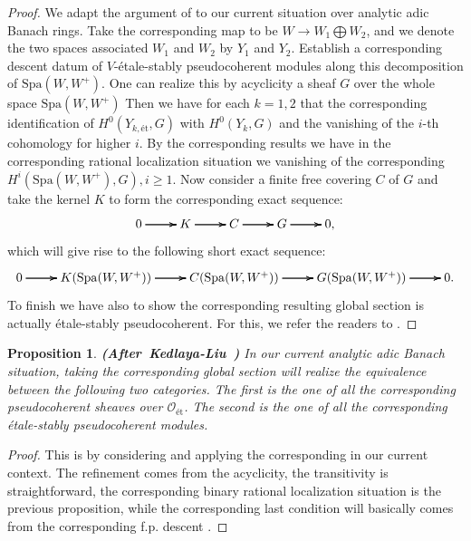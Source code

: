 \documentclass[12pt]{amsart}
\newtheorem{proposition}[theorem]{Proposition}
\theoremstyle{definition}
\numberwithin{equation}{section}
\begin{document}
\begin{proof}
We adapt the argument of \cite[Lemma 2.5.13]{KL2} to our current situation over analytic adic Banach rings. Take the corresponding map to be $W\rightarrow W_1\bigoplus W_2$, and we denote the two spaces associated $W_1$ and $W_2$ by $Y_1$ and $Y_2$. Establish a corresponding descent datum of $V$-\'etale-stably pseudocoherent modules along this decomposition of $\mathrm{Spa}(W,W^+)$. One can realize this by acyclicity a sheaf $G$ over the whole space $\mathrm{Spa}(W,W^+)$ Then we have for each $k=1,2$ that the corresponding identification of $H^0(Y_{k,\text{\'et}},G)$ with $H^0(Y_k,G)$ and the vanishing of the $i$-th cohomology for higher $i$. By the corresponding results we have in the corresponding rational localization situation we vanishing of the corresponding $H^i(\mathrm{Spa}(W,W^+),G),i\geq 1$. Now consider a finite free covering $C$ of $G$ and take the kernel $K$ to form the corresponding exact sequence:
\[
\xymatrix@C+0pc@R+0pc{
0 \ar[r] \ar[r] \ar[r] &K \ar[r] \ar[r] \ar[r] &C  \ar[r] \ar[r] \ar[r] &G \ar[r] \ar[r] \ar[r] &0 ,   
}
\]
which will give rise to the following short exact sequence:
\[
\xymatrix@C+0pc@R+0pc{
0 \ar[r] \ar[r] \ar[r] &K(\mathrm{Spa}(W,W^+)) \ar[r] \ar[r] \ar[r] &C(\mathrm{Spa}(W,W^+))  \ar[r] \ar[r] \ar[r] &G(\mathrm{Spa}(W,W^+)) \ar[r] \ar[r] \ar[r] &0.   
}
\]
To finish we have also to show the corresponding resulting global section is actually \'etale-stably pseudocoherent. For this, we refer the readers to \cite[Lemma 2.22]{TX2}.

  	
\end{proof}


\begin{proposition} \mbox{\bf{(After Kedlaya-Liu \cite[Theorem 2.5.14]{KL2})}}
In our current analytic adic Banach situation, taking the corresponding global section will realize the equivalence between the following two categories. The first is the one of all the corresponding pseudocoherent sheaves over $\mathcal{O}_{\text{\'et}}$. The second is the one of all the corresponding \'etale-stably pseudocoherent modules.	
\end{proposition}


\begin{proof}
This is by considering and applying the corresponding \cite[Lemma 1.10.4]{Ked1} in our current context. The refinement comes from the acyclicity, the transitivity is straightforward, the corresponding binary rational localization situation is the previous proposition, while the corresponding last condition will basically comes from the corresponding f.p. descent \cite[Chapitre VIII]{SGAI}.	
\end{proof}
\end{document}
